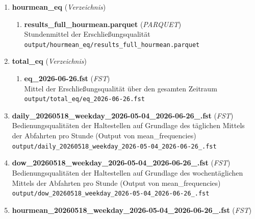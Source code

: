 \begin{enumerate}[label=\arabic*, leftmargin=*, itemsep=0.5em, topsep=0.3em]
\begin{enumerate}[label=\arabic{enumi}.\arabic*, leftmargin=*, itemsep=0.5em, topsep=0.3em]
\begin{enumerate}[label=\arabic{enumi}.\arabic{enumii}.\arabic*, leftmargin=*, itemsep=0.5em, topsep=0.3em]
\item \textbf{results\_full\_hour.parquet} \textnormal{(\textit{PARQUET})}\\
Stündliche Erschließungsqualität\\
\texttt{\small output/hourly\_eq/results\_full\_hour.parquet}
\end{enumerate}
\item \textbf{hourmean\_eq} \textnormal{(\textit{Verzeichnis})}
\begin{enumerate}[label=\arabic{enumi}.\arabic{enumii}.\arabic*, leftmargin=*, itemsep=0.5em, topsep=0.3em]
\item \textbf{results\_full\_hourmean.parquet} \textnormal{(\textit{PARQUET})}\\
Stundenmittel der Erschließungsqualität\\
\texttt{\small output/hourmean\_eq/results\_full\_hourmean.parquet}
\end{enumerate}
\item \textbf{total\_eq} \textnormal{(\textit{Verzeichnis})}
\begin{enumerate}[label=\arabic{enumi}.\arabic{enumii}.\arabic*, leftmargin=*, itemsep=0.5em, topsep=0.3em]
\item \textbf{eq\_2026-06-26.fst} \textnormal{(\textit{FST})}\\
Mittel der Erschließungsqualität über den gesamten Zeitraum\\
\texttt{\small output/total\_eq/eq\_2026-06-26.fst}
\end{enumerate}
\item \textbf{daily\_20260518\_weekday\_2026-05-04\_2026-06-26\_.fst} \textnormal{(\textit{FST})}\\
Bedienungsqualitäten der Haltestellen auf Grundlage des täglichen Mittels der Abfahrten pro Stunde (Output von mean\_frequencies)\\
\texttt{\small output/daily\_20260518\_weekday\_2026-05-04\_2026-06-26\_.fst}
\item \textbf{dow\_20260518\_weekday\_2026-05-04\_2026-06-26\_.fst} \textnormal{(\textit{FST})}\\
Bedienungsqualitäten der Haltestellen auf Grundlage des wochentäglichen Mittels der Abfahrten pro Stunde (Output von mean\_frequencies)\\
\texttt{\small output/dow\_20260518\_weekday\_2026-05-04\_2026-06-26\_.fst}
\item \textbf{hourmean\_20260518\_weekday\_2026-05-04\_2026-06-26\_.fst} \textnormal{(\textit{FST})}\\

\end{enumerate}
\end{enumerate}
